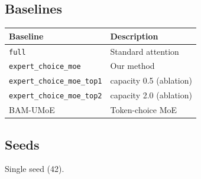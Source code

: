 \subsection{Baselines}

\begin{table}[H]
\centering
\small
\begin{tabular}{ll}
\toprule
\textbf{Baseline} & \textbf{Description} \\
\midrule
\texttt{full} & Standard attention \\
\texttt{expert\_choice\_moe} & Our method \\
\texttt{expert\_choice\_moe\_top1} & capacity 0.5 (ablation) \\
\texttt{expert\_choice\_moe\_top2} & capacity 2.0 (ablation) \\
BAM-UMoE & Token-choice MoE \\
\bottomrule
\end{tabular}
\end{table}

\subsection{Seeds}

Single seed (42).

